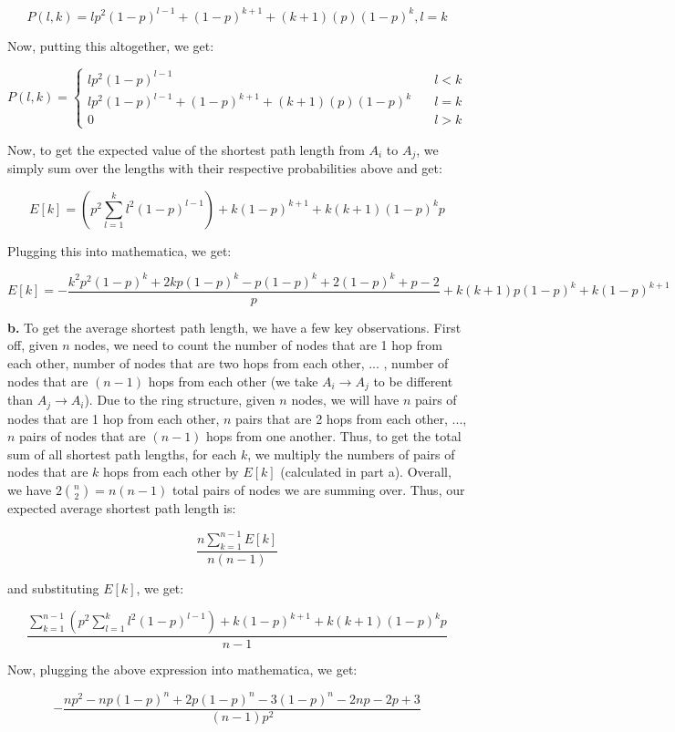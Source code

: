\documentclass[12 pt]{article}
\begin{document}
	\[P(l,k) = lp^2(1-p)^{l-1} + (1-p)^{k+1} + (k+1)(p)(1-p)^k, l = k\]
	
	\noindent Now, putting this altogether, we get: 
	
	$$
	P(l,k) = \left\{
	\begin{array}{ll}
	lp^2(1-p)^{l-1} & \quad l < k \\
	lp^2(1-p)^{l-1} + (1-p)^{k+1} + (k+1)(p)(1-p)^k & \quad l = k\\
	0 & \quad l > k
	\end{array}
	\right.
	$$	
	
	\noindent Now, to get the expected value of the shortest path length from $A_i$ to $A_j$, we simply sum over the lengths with their respective probabilities above and get:
	
	\[E[k] = (p^2 \sum_{l=1}^{k} l^2(1-p)^{l-1}) + k(1-p)^{k+1} + k(k+1)(1-p)^kp\]
	
	\noindent Plugging this into mathematica, we get:
	
	\[E[k] = -\frac{k^2p^2(1-p)^k + 2kp (1-p)^k - p(1-p)^k + 2(1-p)^k + p - 2}{p} + k(k+1)p(1-p)^k + k(1-p)^{k+1}\]
	
	\noindent \textbf{b.} To get the average shortest path length, we have a few key observations. First off, given $n$ nodes, we need to count the number of nodes that are 1 hop from each other, number of nodes that are two hops from each other, ... , number of nodes that are $(n-1)$ hops from each other (we take $A_i \rightarrow A_j$ to be different than $A_j \rightarrow A_i$). Due to the ring structure, given $n$ nodes, we will have $n$ pairs of nodes that are 1 hop from each other, $n$ pairs that are 2 hops from each other, ..., $n$ pairs of nodes that are $(n-1)$ hops from one another. Thus, to get the total sum of all shortest path lengths, for each $k$, we multiply the numbers of pairs of nodes that are $k$ hops from each other by $E[k]$ (calculated in part a). Overall, we have $2 {n \choose 2} = n (n-1)$ total pairs of nodes we are summing over. Thus, our expected average shortest path length is:
	
	\[\frac{n \sum_{k=1}^{n-1} E[k]}{n(n-1)}\]
	
	\noindent and substituting $E[k]$, we get:
	
	\[\frac{\sum_{k=1}^{n-1} (p^2 \sum_{l=1}^{k} l^2(1-p)^{l-1}) + k(1-p)^{k+1} + k(k+1)(1-p)^kp}{n-1}\]
	
	\noindent Now, plugging the above expression into mathematica, we get:
	
	\[-\frac{np^2 - np(1-p)^n + 2p(1-p)^n - 3(1-p)^n - 2np - 2p + 3}{(n-1)p^2} \]
	
\end{document}
